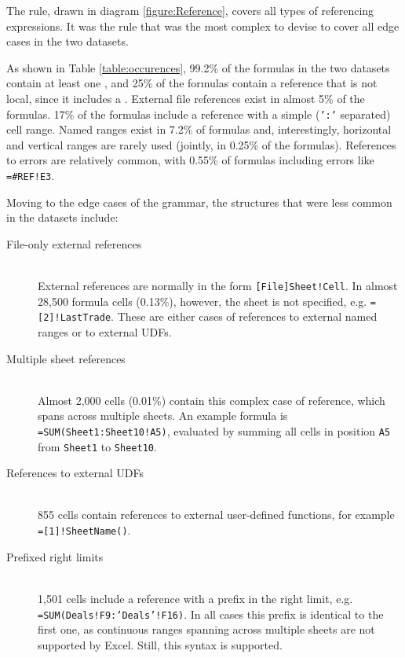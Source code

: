 \documentclass[conference]{IEEEtran}
\begin{document}
The  rule, drawn in diagram \ref{figure:Reference}, covers all types of referencing expressions. It was the rule that was the most complex to devise to cover all edge cases in the two datasets.

As shown in Table \ref{table:occurences}, 99.2\% of the formulas in the two datasets contain at least one , and 25\% of the formulas contain a reference that is not local, since it includes a . External file references exist in almost 5\% of the formulas. 17\% of the formulas include a reference with a simple (\texttt{':'} separated) cell range. Named ranges exist in 7.2\% of formulas and, interestingly, horizontal and vertical ranges are rarely used (jointly, in 0.25\% of the formulas). References to errors are relatively common, with 0.55\% of formulas including errors like \texttt{=\#REF!E3}.

Moving to the edge cases of the grammar, the structures that were less common in the datasets include:

\begin{description}
	\item[File-only external references] \hfill \\
	External references are normally in the form \texttt{[File]Sheet!Cell}. In almost 28,500 formula cells (0.13\%), however, the sheet is not specified, e.g. \texttt{=[2]!LastTrade}. These are either cases of references to external named ranges or to external UDFs.
	\item[Multiple sheet references] \hfill \\
	Almost 2,000 cells (0.01\%) contain this complex case of reference, which spans across multiple sheets. An example formula is \texttt{=SUM(Sheet1:Sheet10!A5)}, evaluated by summing all cells in position \texttt{A5} from \texttt{Sheet1} to \texttt{Sheet10}.
	\item[References to external UDFs] \hfill \\
	855 cells contain references to external user-defined functions, for example \texttt{=[1]!SheetName()}.
	\item[Prefixed right limits] \hfill \\
	1,501 cells include a reference with a prefix in the right limit, e.g. \texttt{=SUM(Deals!F9:'Deals'!F16)}. In all cases this prefix is identical to the first one, as continuous ranges spanning across multiple sheets are not supported by Excel. Still, this syntax is supported.
\end{description}
\end{document}
